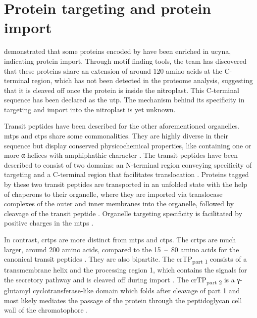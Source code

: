 \section{Protein targeting and protein import}
\cite{coale_nitrogen-fixing_2024} demonstrated that some proteins encoded by  have been enriched in \gls{ucyna}, indicating protein import. Through motif finding tools, the team has discovered that these proteins share an extension of around 120 amino acids at the C-terminal region, which has not been detected in the proteome analysis, suggesting that it is cleaved off once the protein is inside the nitroplast. This C-terminal sequence has been declared as the \gls{utp}. The mechanism behind its specificity in targeting and import into the nitroplast is yet unknown.
\par Transit peptides have been described for the other aforementioned organelles. \Gls{mtps} and \gls{ctps} share some commonalities. They are highly diverse in their sequence but display conserved physicochemical properties, like containing one or more α-helices with amphiphathic character \parencite{schleiff_common_2011}. The transit peptides have been described to consist of two domains: an N-terminal region conveying specificity of targeting and a C-terminal region that facilitates translocation \parencite{lee_molecular_2019}. Proteins tagged by these two transit peptides are transported in an unfolded state with the help of chaperons to their organelle, where they are imported via translocase complexes of the outer and inner membranes into the organelle, followed by cleavage of the transit peptide \parencite{schleiff_common_2011}. Organelle targeting specificity is facilitated by positive charges in the \gls{mtps} \parencite{kunze_similarity_2015}.
\par In contrast, \gls{crtps} are more distinct from \gls{mtps} and \gls{ctps}. The \gls{crtps} are much larger, around 200 amino acids, compared to the 15~--~80 amino acids for the canonical transit peptides \parencite{garg_role_2016, von_heinje_chloroplast_1991, sorensen_protein_2025}. They are also bipartite. The crTP\textsubscript{part 1} consists of a transmembrane helix and the processing region 1, which contains the signals for the secretory pathway and is cleaved off during import \parencite{oberleitner_bipartite_2022, klimenko_paulinella_2025}. The crTP\textsubscript{part 2} is a γ-glutamyl cyclotransferase-like domain which folds after cleavage of part 1 and most likely mediates the passage of the protein through the peptidoglycan cell wall of the chromatophore  \parencite{klimenko_paulinella_2025, oberleitner_bipartite_2022}.
